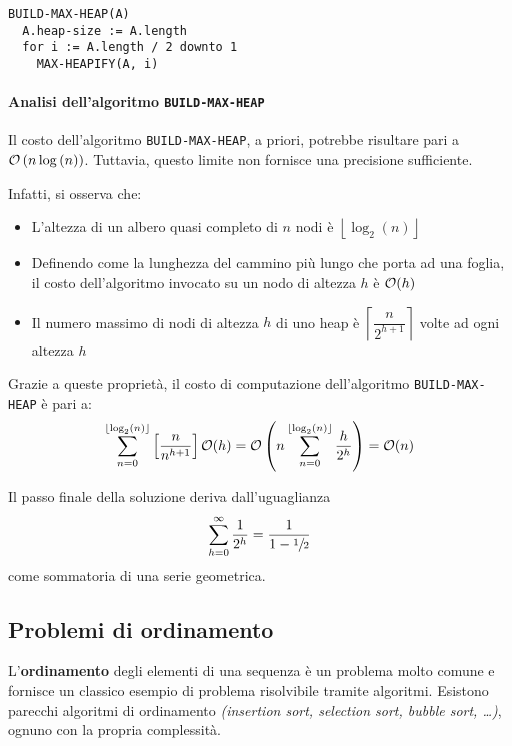 \documentclass[italian, 10pt]{article}
\begin{document}
\begin{lstlisting}[style=pseudocode, caption={Algoritmo \texttt{BUILD-MAX-HEAP}}, label={lst:algoritmo-build-max-heap}]
BUILD-MAX-HEAP(A)
  A.heap-size := A.length
  for i := A.length / 2 downto 1
    MAX-HEAPIFY(A, i)
\end{lstlisting}

\paragraph{Analisi dell'algoritmo \texttt{BUILD-MAX-HEAP}}

Il costo dell'algoritmo \texttt{BUILD-MAX-HEAP}, a priori, potrebbe risultare pari a \(\mathcal{O}\left(n \log{(n)}\right)\).
Tuttavia, questo limite non fornisce una precisione sufficiente.

Infatti, si osserva che:

\begin{itemize}
  \item L'altezza di un albero quasi completo di \(n\) nodi è \(\left\lfloor \log_2(n) \right\rfloor\)
  \item Definendo come  la lunghezza del cammino più lungo che porta ad una foglia, il costo dell'algoritmo invocato su un nodo di altezza \(h\) è \(\mathcal{O}(h)\)
  \item Il numero massimo di nodi di altezza \(h\) di uno heap è \(\left\lceil \dfrac{n}{2^{h+1}} \right\rceil\) volte ad ogni altezza \(h\)
\end{itemize}

Grazie a queste proprietà, il costo di computazione dell'algoritmo \texttt{BUILD-MAX-HEAP} è pari a:
\[ \displaystyle \sum_{n=0}^{\left\lfloor \log_2(n) \right\rfloor} \left[ \dfrac{n}{n^{h+1}} \right] \mathcal{O}(h) = \mathcal{O} \left(n \displaystyle \sum_{n=0}^{\left\lfloor \log_2(n) \right\rfloor} \dfrac{h}{2^h} \right) = \mathcal{O} (n)\]

Il passo finale della soluzione deriva dall'uguaglianza
\[ \sum_{h=0}^{\infty} \dfrac{1}{2^h} = \dfrac{1}{1 - \sfrac{1}{2}} \]
come sommatoria di una serie geometrica.

\subsection{Problemi di ordinamento}

L'\textbf{ordinamento} degli elementi di una sequenza è un problema molto comune e fornisce un classico esempio di problema risolvibile tramite algoritmi.
Esistono parecchi algoritmi di ordinamento \textit{(insertion sort, selection sort, bubble sort, \ldots)}, ognuno con la propria complessità.
\end{document}

